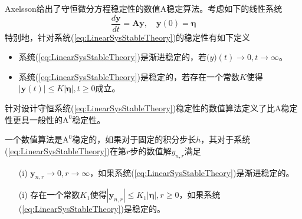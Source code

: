 Axelsson给出了守恒微分方程稳定性的数值A稳定算法\cite{Axelsson1969a}。考虑如下的线性系统
\begin{equation}
\frac{d\bm{y}}{dt}=\bm{Ay},\quad \bm{y}(0)=\bm{\eta}\label{eq:LinearSysStableTheory}
\end{equation}
特别地，针对系统(\ref{eq:LinearSysStableTheory})的稳定性有如下定义
\begin{itemize}
\item 系统(\ref{eq:LinearSysStableTheory})是渐进稳定的，若$\bm(y)(t)\to0,t\to\infty$。
\item 系统(\ref{eq:LinearSysStableTheory})是稳定的，若存在一个常数$K$使得$|\bm{y}(t)|\le K|\bm{\eta}|,t\ge0$成立。
\end{itemize}
针对设计守恒系统(\ref{eq:LinearSysStableTheory})稳定性的数值算法定义了比A稳定性更具一般性的$\text{A}^0$稳定性。
\begin{definition}
一个数值算法是$\text{A}^0$稳定的\cite{Axelsson1969a}，如果对于固定的积分步长$h$，其对于系统(\ref{eq:LinearSysStableTheory})在第$r$步的数值解$y_{n,r}$满足
\begin{itemize}
\item[(i)] $\bm{y}_{n,r}\to0,r\to\infty$，如果系统(\ref{eq:LinearSysStableTheory})是渐进稳定的。
\item[(i)] 存在一个常数$K_1$使得$|\bm{y}_{n,r}|\le K_1|\bm{\eta}|,r\ge0$，如果系统(\ref{eq:LinearSysStableTheory})是稳定的。
\end{itemize}
\end{definition}


